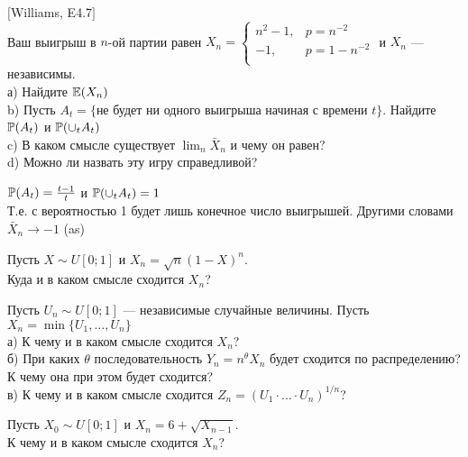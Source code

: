 \begin{solution}
\begin{solution}
\begin{solution}
\begin{solution}
\begin{problem}
$[$Williams, E4.7$]$ \\
Ваш выигрыш в $n$-ой партии равен $X_{n}=
\begin{cases}
  n^{2}-1, & p=n^{-2} \\
  -1, & p=1-n^{-2} \\
\end{cases}$ и $X_{n}$ --- независимы. \\
а) Найдите $\E(X_{n})$ \\
b) Пусть $A_{t}=\{$не будет ни одного выигрыша начиная с времени
$t\}$. Найдите $\P(A_{t})$ и $\P(\cup_{t} A_{t})$ \\
c) В каком смысле существует $\lim_{n}\bar{X}_{n}$ и чему он
равен? \\
d) Можно ли назвать эту игру справедливой? 
\end{problem} 
\begin{solution} 


$\P(A_{t})=\frac{t-1}{t}$ и $\P(\cup_{t} A_{t})=1$ \\
Т.е. с вероятностью 1 будет лишь конечное число выигрышей. Другими
словами $\bar{X}_{n} \rightarrow -1$ (as) 
\end{solution}

\begin{problem}
Пусть $X\sim U[0;1]$ и $X_{n}=\sqrt{n}(1-X)^{n}$. \\
Куда и в каком смысле сходится $X_{n}$? 
\end{problem} 
\begin{solution} 

\end{solution}

\begin{problem}
Пусть $U_{n}\sim U[0;1]$ --- независимые случайные величины. Пусть
$X_{n}=\min\{U_{1},\ldots,U_{n}\}$ \\
а) К чему и в каком смысле сходится $X_{n}$? \\
б) При каких $\theta$ последовательность $Y_{n}=n^{\theta}X_{n}$
будет сходится по распределению? К чему она при этом будет
сходится? \\
в) К чему и в каком смысле сходится $Z_{n}=(U_{1}\cdot\ldots\cdot U_{n})^{1/n}$? 
\end{problem} 
\begin{solution} 

\end{solution}

\begin{problem}
Пусть $X_{0}\sim U[0;1]$ и $X_{n}=6+\sqrt{X_{n-1}}$. \\
К чему и в каком смысле сходится $X_{n}$? 
\end{problem} 
\begin{solution} 


\end{solution}
\end{solution}
\end{solution}
\end{solution}
\end{solution}
